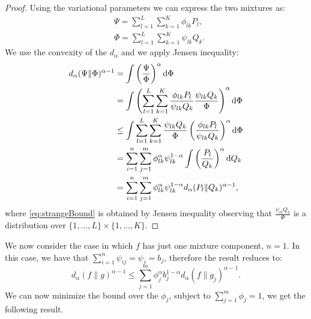 \documentclass{article}
\begin{document}
\begin{proof}
Using the variational parameters we can express the two mixtures as:
\begin{align*}
    & \Psi = \sum_{l=1}^L \sum_{k=1}^K \phi_{lk} P_l,\\
    & \Phi = \sum_{l=1}^L \sum_{k=1}^K \psi_{lk} Q_k.
\end{align*}
    We use the convexity of the $d_{\alpha}$ and we apply Jensen inequality:
    \begin{align}
        d_{\alpha}(\Psi \| \Phi)^{\alpha-1} & = \int \left( \frac{\Psi}{\Phi} \right)^{\alpha} \mathrm{d}\Phi \notag\\
        & = \int \left( \sum_{l=1}^L \sum_{k=1}^K \frac{\phi_{lk} P_l}{\psi_{lk} Q_k} \frac{\psi_{lk} Q_k}{\Phi} \right)^{\alpha} \mathrm{d}\Phi \notag \\
        & \le \int \sum_{l=1}^L \sum_{k=1}^K \frac{\psi_{lk} Q_k}{\Phi} \left(  \frac{\phi_{lk} P_l}{\psi_{lk} Q_k}  \right)^{\alpha} \mathrm{d}\Phi \label{eq:strangeBound}\\
        & = \sum_{i=1}^n \sum_{j=1}^m \phi_{lk}^{\alpha} \psi_{lk}^{1-\alpha}  \int \left( \frac{P_l}{Q_k}  \right)^{\alpha} \mathrm{d}Q_k \notag \\
        & = \sum_{i=1}^n \sum_{j=1}^m \phi_{lk}^{\alpha} \psi_{lk}^{1-\alpha}  d_{\alpha}(P_l \| Q_k)^{\alpha-1}, \notag
    \end{align}
    where \eqref{eq:strangeBound} is obtained by Jensen inequality observing that $\frac{\psi_{lk} Q_k}{\Phi}$ is a distribution over $\{1,...,L\} \times \{1,...,K\}$.
\end{proof}

We now consider the case in which $f$ has just one mixture component, \ie $n = 1$. In this case, we have that $\sum_{i=1}^n \psi_{ij}= \psi_j = b_j$, therefore the result reduces to:
\begin{equation}
     d_{\alpha} (f \| g)^{\alpha-1} \le  \sum_{j=1}^m \phi_{j}^\alpha b_{j}^{1-\alpha} d_{\alpha} (f \| g_j)^{\alpha-1}.
\end{equation}
We can now minimize the bound over the $\phi_j$, subject to $\sum_{j=1}^m \phi_j = 1$, we get the following result.
\end{document}
